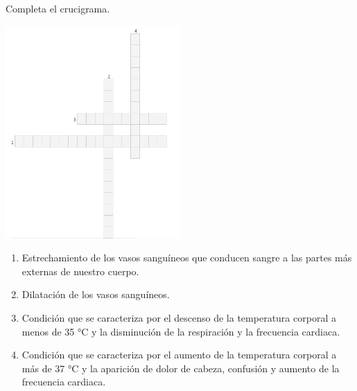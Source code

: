 Completa el crucigrama.
\begin{center}
    \includegraphics[width=0.5\textwidth]{Images/SINFI_U3_AC81_IMG1.png}
\end{center}
\begin{enumerate}
    \item Estrechamiento de los vasos sanguíneos que conducen sangre a las partes más externas de nuestro cuerpo.
    \item Dilatación de los vasos sanguíneos.
    \item Condición que se caracteriza por el descenso de la temperatura corporal a menos de 35 °C y la disminución de la respiración y la frecuencia cardiaca.
    \item Condición que se caracteriza por el aumento de la temperatura corporal a más de 37 °C y la aparición de dolor de cabeza, confusión y aumento de la frecuencia cardiaca.
\end{enumerate}